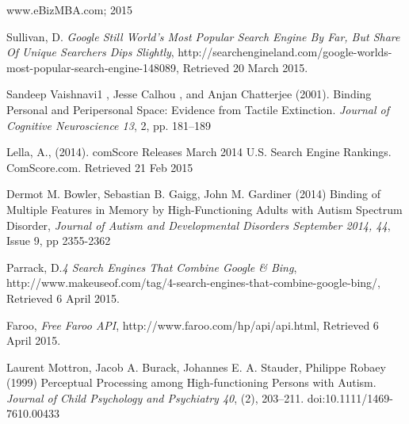 \documentclass[a4paper, 11pt]{article}
\begin{document}
\begin{thebibliography}{100}
www.eBizMBA.com; 2015

Sullivan, D. \textit{Google Still World’s Most Popular Search Engine By Far, But Share Of Unique Searchers Dips Slightly},  http://searchengineland.com/google-worlds-most-popular-search-engine-148089, Retrieved 20 March 2015.  

Sandeep Vaishnavi1 , Jesse Calhou , and Anjan Chatterjee (2001). Binding Personal and Peripersonal Space: Evidence from Tactile Extinction. \textit{Journal of Cognitive Neuroscience 13}, 2, pp. 181–189

Lella, A., (2014). comScore Releases March 2014 U.S. Search Engine Rankings. ComScore.com. Retrieved 21 Feb 2015

Dermot M. Bowler, Sebastian B. Gaigg, John M. Gardiner (2014) Binding of Multiple Features in Memory by High-Functioning Adults with Autism Spectrum Disorder, \textit{Journal of Autism and Developmental Disorders September 2014, 44}, Issue 9, pp 2355-2362

 Parrack, D.\textit{4 Search Engines That Combine Google \& Bing}, http://www.makeuseof.com/tag/4-search-engines-that-combine-google-bing/, Retrieved 6 April 2015.


Faroo, \textit{Free Faroo API}, http://www.faroo.com/hp/api/api.html, Retrieved 6 April 2015.

 Laurent Mottron, Jacob A. Burack, Johannes E. A. Stauder, Philippe Robaey (1999) Perceptual Processing among High-functioning Persons with Autism. \textit{Journal of Child Psychology and Psychiatry 40}, (2), 203–211. doi:10.1111/1469-7610.00433

\end{thebibliography}
\end{document}
